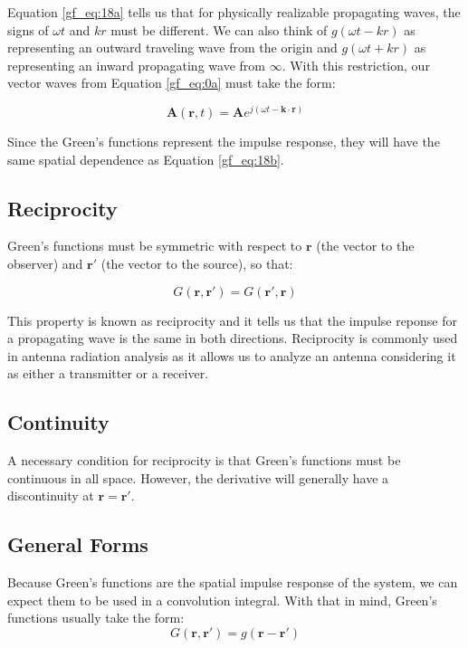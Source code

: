 Equation \ref{gf_eq:18a} tells us that for physically realizable propagating waves, the signs of $\omega t$ and $kr$ must be different. We can also think of $g\left(\omega t - kr\right)$ as representing an outward traveling wave from the origin and $g\left(\omega t + kr\right)$ as representing an inward propagating wave from $\infty$. With this restriction, our vector waves from Equation \ref{gf_eq:0a} must take the form:

\begin{equation}
\mathbf{A}\left(\mathbf{r},t\right) = \mathbf{A}e^{j\left(\omega t - \mathbf{k} \cdot \mathbf{r} \right)}
\label{gf_eq:18b}
\end{equation}
\renewcommand{\baselinestretch}{2} \small\normalsize

Since the Green's functions represent the impulse response, they will have the same spatial dependence as Equation \ref{gf_eq:18b}.

\subsection{Reciprocity} \label{gf_sec:reciprocity}
Green's functions must be symmetric with respect to $\mathbf{r}$ (the vector to the observer) and $\mathbf{r}'$ (the vector to the source), so that:

\begin{equation}
G\left(\mathbf{r},\mathbf{r}' \right) = G\left(\mathbf{r}',\mathbf{r} \right)
\label{gf_eq:18c}
\end{equation}
\renewcommand{\baselinestretch}{2} \small\normalsize

This property is known as reciprocity and it tells us that the impulse reponse for a propagating wave is the same in both directions. Reciprocity is commonly used in antenna radiation analysis as it allows us to analyze an antenna considering it as either a transmitter or a receiver.

\subsection{Continuity} \label{gf_sec:continuity}
A necessary condition for reciprocity is that Green's functions must be continuous in all space. However, the derivative will generally have a discontinuity at $\mathbf{r} = \mathbf{r}'$.

\subsection{General Forms}
Because Green's functions are the spatial impulse response of the system, we can expect them to be used in a convolution integral. With that in mind, Green's functions usually take the form:
\begin{equation}
G\left(\mathbf{r},\mathbf{r}' \right) = g\left( \mathbf{r} - \mathbf{r}'\right)
\label{gf_eq:18d}
\end{equation}
\renewcommand{\baselinestretch}{2} \small\normalsize

